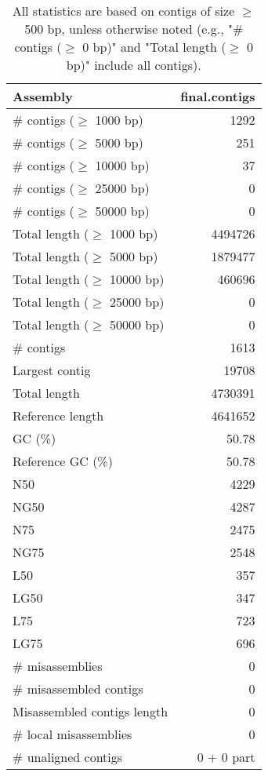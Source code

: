\documentclass[12pt,a4paper]{article}
\begin{document}
\begin{table}[ht]
\begin{center}
\caption{All statistics are based on contigs of size $\geq$ 500 bp, unless otherwise noted (e.g., "\# contigs ($\geq$ 0 bp)" and "Total length ($\geq$ 0 bp)" include all contigs).}
\begin{tabular}{|l*{1}{|r}|}
\hline
Assembly & final.contigs \\ \hline
\# contigs ($\geq$ 1000 bp) & 1292 \\ \hline
\# contigs ($\geq$ 5000 bp) & 251 \\ \hline
\# contigs ($\geq$ 10000 bp) & 37 \\ \hline
\# contigs ($\geq$ 25000 bp) & 0 \\ \hline
\# contigs ($\geq$ 50000 bp) & 0 \\ \hline
Total length ($\geq$ 1000 bp) & 4494726 \\ \hline
Total length ($\geq$ 5000 bp) & 1879477 \\ \hline
Total length ($\geq$ 10000 bp) & 460696 \\ \hline
Total length ($\geq$ 25000 bp) & 0 \\ \hline
Total length ($\geq$ 50000 bp) & 0 \\ \hline
\# contigs & 1613 \\ \hline
Largest contig & 19708 \\ \hline
Total length & 4730391 \\ \hline
Reference length & 4641652 \\ \hline
GC (\%) & 50.78 \\ \hline
Reference GC (\%) & 50.78 \\ \hline
N50 & 4229 \\ \hline
NG50 & 4287 \\ \hline
N75 & 2475 \\ \hline
NG75 & 2548 \\ \hline
L50 & 357 \\ \hline
LG50 & 347 \\ \hline
L75 & 723 \\ \hline
LG75 & 696 \\ \hline
\# misassemblies & 0 \\ \hline
\# misassembled contigs & 0 \\ \hline
Misassembled contigs length & 0 \\ \hline
\# local misassemblies & 0 \\ \hline
\# unaligned contigs & 0 + 0 part \\ \hline

\end{tabular}
\end{center}
\end{table}
\end{document}
